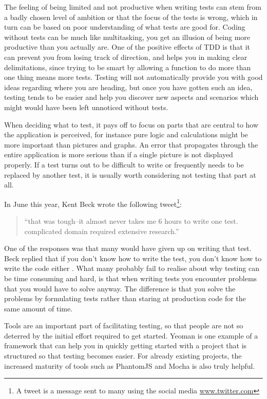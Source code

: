 \documentclass[11pt]{article}
\begin{document}
The feeling of being limited and not productive when writing tests can stem from a badly chosen level of ambition or that the focus of the tests is wrong, which in turn can be based on poor understanding of what tests are good for. Coding without tests can be much like multitasking, you get an illusion of being more productive than you actually are. One of the positive effects of TDD is that it can prevent you from losing track of direction, and helps you in making clear delimitations, since trying to be smart by allowing a function to do more than one thing means more tests. Testing will not automatically provide you with good ideas regarding where you are heading, but once you have gotten such an idea, testing tends to be easier and help you discover new aspects and scenarios which might would have been left unnoticed without tests. \cite[question~8]{Edelstam}

When deciding what to test, it pays off to focus on parts that are central to how the application is perceived, for instance pure logic and calculations might be more important than pictures and graphs. An error that propagates through the entire application is more serious than if a single picture is not displayed properly. If a test turns out to be difficult to write or frequently needs to be replaced by another test, it is usually worth considering not testing that part at all. \cite[questions~9-10]{Edelstam}

In June this year, Kent Beck wrote the following tweet\footnote{A tweet is a message sent to many using the social media \url{www.twitter.com}}:

\begin{quote}
``that was tough--it almost never takes me 6 hours to write one test. complicated domain required extensive research.''
\end{quote}

One of the responses was that many would have given up on writing that test. Beck replied that if you don't know how to write the test, you don't know how to write the code either \cite{TwitterKentBeck}. What many probably fail to realise about why testing can be time consuming and hard, is that when writing tests you encounter problems that you would have to solve anyway. The difference is that you solve the problems by formulating tests rather than staring at production code for the same amount of time. \cite[question~11]{Edelstam}

Tools are an important part of facilitating testing, so that people are not so deterred by the initial effort required to get started. Yeoman is one example of a framework that can help you in quickly getting started with a project that is structured so that testing becomes easier. For already existing projects, the increased maturity of tools such as PhantomJS and Mocha is also truly helpful. \cite[questions~11-12 and 20]{Edelstam}
\end{document}
